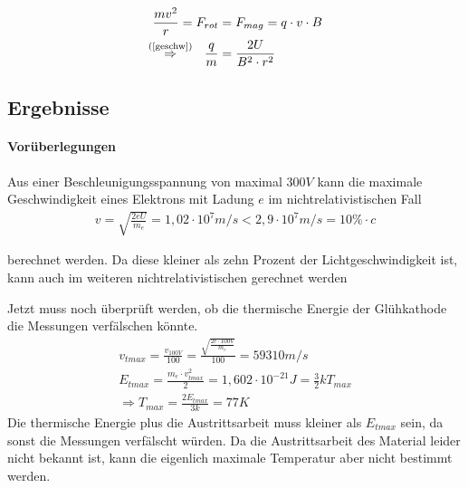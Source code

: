 \documentclass[11pt, a4paper]{article}
\begin{document}
    \begin{align}
        \frac{mv^2}{r} = F_{rot} &= F_{mag} = q \cdot v \cdot B \\
        \overset{\text{(\ref{geschw})}}{\Rightarrow} \ \  \frac{q}{m} &= \frac{2U}{B^2 \cdot r^2} \label{qm_formel}
    \end{align}

    \subsection{Ergebnisse}
    \paragraph{Vorüberlegungen}

    Aus einer Beschleunigungsspannung von maximal $300 \si{V}$ kann die maximale Geschwindigkeit eines Elektrons mit Ladung $e$ im nichtrelativistischen Fall
    \begin{align}
        v = \sqrt{\frac{2 e U}{m_e}} = 1,02 \cdot 10^{7} \si{m/s} < 2,9 \cdot 10^{7} \si{m/s} = 10\% \cdot c
    \end{align}

    berechnet werden. Da diese kleiner als zehn Prozent der Lichtgeschwindigkeit ist, kann auch im weiteren nichtrelativistischen gerechnet werden

    Jetzt muss noch überprüft werden, ob die thermische Energie der Glühkathode die Messungen verfälschen könnte.
    \begin{align}
        v_{tmax} = \frac{v_{100V}}{100} = \frac{\sqrt{\frac{2 e \cdot 100 \si{V}}{m_e}}}{100} = 59310 \si{m \per s} \\
        E_{tmax} = \frac{m_e \cdot v_{tmax}^2}{2} = 1,602 \cdot 10^{-21} \si{J} = \frac{3}{2} k T_{max} \\
        \Rightarrow T_{max} = \frac{2 E_{tmax}}{3 k} = 77K
    \end{align}
    Die thermische Energie plus die Austrittsarbeit muss kleiner als $E_{tmax}$ sein, da sonst die Messungen verfälscht würden. Da die Austrittsarbeit des Material leider nicht bekannt ist, kann die eigenlich maximale Temperatur aber nicht bestimmt werden.
\end{document}
